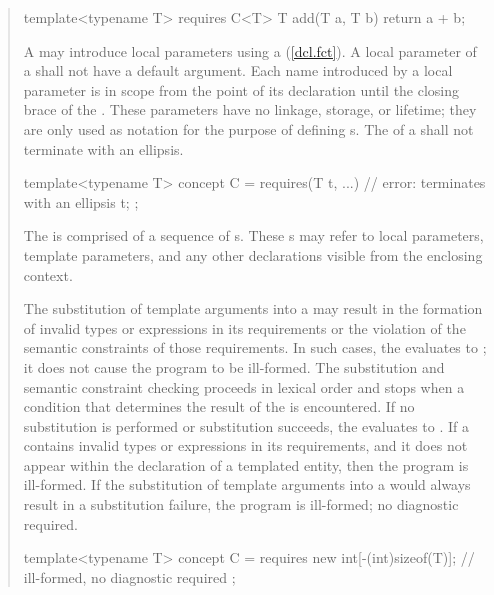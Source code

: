 \begin{quote}
\begin{addedblock}
\begin{codeblock}
template<typename T> requires C<T> 
  T add(T a, T b) { return a + b; }
\end{codeblock}
\exitnote

\pnum
A  may introduce local parameters using a
(\ref{dcl.fct}). 
%
A local parameter of a  shall not have a 
default argument.
%
Each name introduced by a local parameter is in scope from the point
of its declaration until the closing brace of the
.
%
These parameters have no linkage, storage, or lifetime; they are only used
as notation for the purpose of defining s.
%
The  of a 
 shall
not terminate with an ellipsis.
\enterexample
\begin{codeblock}
template<typename T>
  concept C = requires(T t, ...) { // error: terminates with an ellipsis
    t; 
  };
\end{codeblock}
\exitexample

\pnum
The  is comprised of 
a sequence of s.
%
These s may refer to local 
parameters, template parameters, and any other declarations visible from the 
enclosing context. 

\pnum
The substitution of template arguments into a  
may result in the formation of invalid types or expressions in its
requirements or the violation of the semantic constraints of those requirements.
In such cases, the  evaluates to ;
it does not cause the program to be ill-formed.
The substitution and semantic constraint checking
proceeds in lexical order and stops when a condition that
determines the result of the  is encountered.
If no substitution is performed or substitution succeeds,
the  evaluates to .
\enternote
If a  contains invalid types or expressions in
its requirements, and it does not appear within the declaration of a templated
entity, then the program is ill-formed.
\exitnote
If the substitution of template arguments into a  
would always result in a substitution failure, the program is ill-formed; 
no diagnostic required.
%
\enterexample
\begin{codeblock}
template<typename T> concept C =
  requires {
    new int[-(int)sizeof(T)]; // ill-formed, no diagnostic required
  };
\end{codeblock}
\exitexample



\end{addedblock}
\end{quote}
